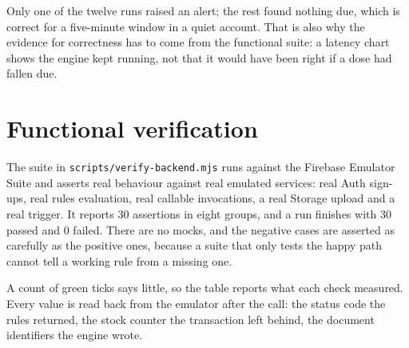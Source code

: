 \documentclass[11pt,a4paper]{report}
\begin{document}
Only one of the twelve runs raised an alert; the rest found nothing due, which is correct for a five-minute
window in a quiet account. That is also why the evidence for correctness has to come from the functional
suite: a latency chart shows the engine kept running, not that it would have been right if a dose had
fallen due.

\section{Functional verification}

The suite in \texttt{scripts/verify-backend.mjs} runs against the Firebase Emulator Suite and asserts
real behaviour against real emulated services: real Auth sign-ups, real rules evaluation, real callable
invocations, a real Storage upload and a real trigger. It reports 30 assertions in eight groups, and a run
finishes with 30 passed and 0 failed. There are no mocks, and the negative cases are asserted as carefully
as the positive ones, because a suite that only tests the happy path cannot tell a working rule from a
missing one.

A count of green ticks says little, so the table reports what each check measured. Every value is read
back from the emulator after the call: the status code the rules returned, the stock counter the
transaction left behind, the document identifiers the engine wrote.
\end{document}
